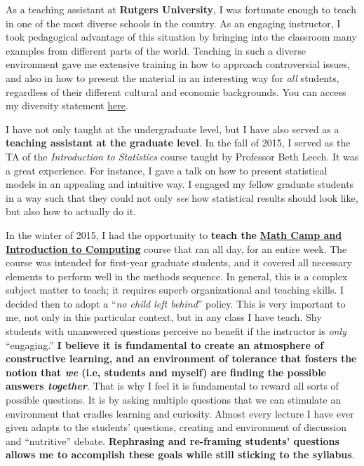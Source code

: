 As a teaching assistant at {\bf Rutgers University}, I was fortunate enough to teach in one of the most diverse schools in the country. As an engaging instructor, I took pedagogical advantage of this situation by bringing into the classroom many examples from different parts of the world. Teaching in such a diverse environment gave me extensive training in how to approach controversial issues, and also in how to present the material in an interesting way for \emph{all} students, regardless of their different cultural and economic backgrounds. You can access my diversity statement \href{http://github.com/hbahamonde/Job_Market/raw/master/Bahamonde_Diversity_Statement.pdf}{here}.


I have not only taught at the undergraduate level, but I have also served as a {\bf teaching assistant at the graduate level}. In the fall of 2015, I served as the TA of the \emph{Introduction to Statistics} course taught by Professor Beth Leech. It was a great experience. For instance, I gave a talk on how to present statistical models in an appealing and intuitive way. I engaged my fellow graduate students in a way such that they could not only \emph{see} how statistical results should look like, but also how to actually do it. 

In the winter of 2015, I had the opportunity to {\bf teach the} \href{https://github.com/hbahamonde/Math-Camp/raw/master/Syllabus/Math_Camp_Syllabus.pdf}{{\bf Math Camp and Introduction to Computing}} course that ran all day, for an entire week. The course was intended for first-year graduate students, and it covered all necessary elements to perform well in the methods sequence. In general, this is a complex subject matter to teach; it requires superb organizational and teaching skills. I decided then to adopt a ``\emph{no child left behind}'' policy. This is very important to me, not only in this particular context, but in any class I have teach. Shy students with unanswered questions perceive no benefit if the instructor is \emph{only} ``engaging.'' {\bf I believe it is fundamental to create an atmosphere of constructive learning, and an environment of tolerance that fosters the notion that \emph{we} (i.e, students and myself) are finding the possible answers \emph{together}}. That is why I feel it is fundamental to reward all sorts of possible questions. It is by asking multiple questions that we can stimulate an environment that cradles learning and curiosity. Almost every lecture I have ever given adapts to the students' questions, creating and environment of discussion and ``nutritive'' debate. {\bf Rephrasing and re-framing students' questions allows me to accomplish these goals while still sticking to the syllabus}. 

